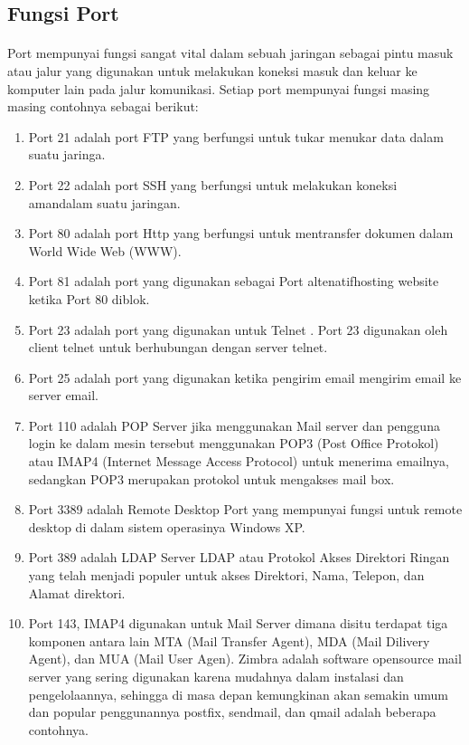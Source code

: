 \documentclass[12pt,a4paper]{article}
\begin{document}
\subsection{Fungsi Port}
\paragraph{}
\hspace{1cm}
Port mempunyai fungsi sangat vital dalam sebuah jaringan sebagai pintu masuk atau jalur yang digunakan untuk melakukan koneksi masuk dan keluar ke komputer lain pada jalur komunikasi. Setiap port mempunyai fungsi masing masing contohnya sebagai berikut:
\begin{enumerate}
\item Port 21 adalah port FTP yang berfungsi untuk tukar menukar data dalam suatu jaringa.
\item Port 22 adalah port SSH yang berfungsi untuk  melakukan koneksi amandalam suatu jaringan.
\item Port 80 adalah port Http yang berfungsi untuk mentransfer dokumen dalam World Wide Web (WWW).
\item Port 81 adalah port yang digunakan sebagai Port altenatifhosting website ketika Port 80 diblok.
\item Port 23 adalah port yang digunakan untuk Telnet . Port 23 digunakan oleh client telnet untuk berhubungan dengan server telnet.
\item Port 25 adalah port yang digunakan ketika pengirim email  mengirim email ke server email.
\item Port 110 adalah POP Server  jika menggunakan Mail server dan pengguna login ke dalam mesin tersebut menggunakan POP3 (Post Office Protokol) atau IMAP4 (Internet Message Access Protocol) untuk menerima emailnya, sedangkan POP3 merupakan protokol untuk mengakses mail box.
\item Port 3389 adalah Remote Desktop Port yang  mempunyai fungsi untuk remote desktop di dalam sistem operasinya Windows XP.
\item Port 389 adalah LDAP Server LDAP atau Protokol Akses Direktori Ringan yang telah
menjadi populer untuk akses Direktori, Nama, Telepon, dan Alamat direktori.
\item Port 143, IMAP4 digunakan untuk Mail Server dimana disitu terdapat tiga komponen antara lain MTA (Mail Transfer Agent), MDA (Mail Dilivery Agent), dan MUA (Mail User Agen). Zimbra adalah software opensource mail server yang sering digunakan karena mudahnya dalam instalasi dan pengelolaannya, sehingga di masa depan kemungkinan akan semakin umum dan popular penggunannya postfix, sendmail, dan qmail adalah beberapa contohnya.

\end{enumerate}
\end{document}
